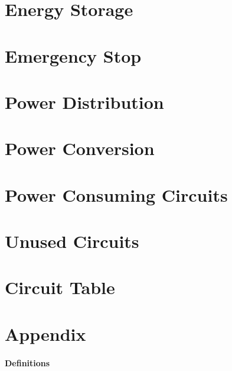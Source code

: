     




\section{Energy Storage}

\section{Emergency Stop}

\section{Power Distribution}

\section{Power Conversion}

\section{Power Consuming Circuits}

\section{Unused Circuits}

\section{Circuit Table}

\section{Appendix}

\paragraph{Definitions}

